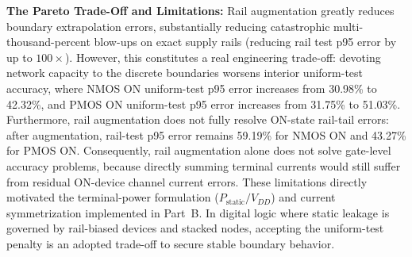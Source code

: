 \documentclass[11pt,a4paper]{article}
\numberwithin{table}{section}
\numberwithin{figure}{section}
\begin{document}
\textbf{The Pareto Trade-Off and Limitations:} Rail augmentation greatly reduces boundary extrapolation errors, substantially reducing catastrophic multi-thousand-percent blow-ups on exact supply rails (reducing rail test p95 error by up to $100\times$). However, this constitutes a real engineering trade-off: devoting network capacity to the discrete boundaries worsens interior uniform-test accuracy, where NMOS ON uniform-test p95 error increases from 30.98\% to 42.32\%, and PMOS ON uniform-test p95 error increases from 31.75\% to 51.03\%. Furthermore, rail augmentation does not fully resolve ON-state rail-tail errors: after augmentation, rail-test p95 error remains 59.19\% for NMOS ON and 43.27\% for PMOS ON. Consequently, rail augmentation alone does not solve gate-level accuracy problems, because directly summing terminal currents would still suffer from residual ON-device channel current errors. These limitations directly motivated the terminal-power formulation ($P_{\mathrm{static}}/V_{DD}$) and current symmetrization implemented in Part~B. In digital logic where static leakage is governed by rail-biased devices and stacked nodes, accepting the uniform-test penalty is an adopted trade-off to secure stable boundary behavior.
\end{document}
